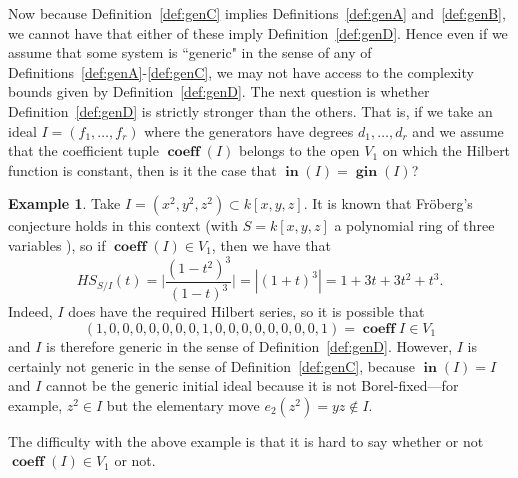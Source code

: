 \documentclass[11pt]{article}
\DeclareMathOperator{\Init}{\mathbf{in}}
\DeclareMathOperator{\gin}{\mathbf{gin}}
\DeclareMathOperator{\coeff}{\textbf{coeff}}
\theoremstyle{definition}
\newtheorem{example}{Example}
\begin{document}
Now because Definition~\ref{def:genC} implies Definitions~\ref{def:genA} and~\ref{def:genB}, we cannot have that either of these imply Definition~\ref{def:genD}. Hence even if we assume that some system is ``generic" in the sense of any of Definitions~\ref{def:genA}-\ref{def:genC}, we may not have access to the complexity bounds given by Definition~\ref{def:genD}. The next question is whether Definition~\ref{def:genD} is strictly stronger than the others. That is, if we take an ideal $I = (f_1, \dots, f_r)$ where the generators have degrees $d_1, \dots, d_r$ and we assume that the coefficient tuple $\coeff(I)$ belongs to the open $V_1$ on which the Hilbert function is constant, then is it the case that $\Init(I) = \gin(I)$? 

\begin{example}\label{maybecounterex}
	Take $I = (x^2, y^2, z^2) \subset k[x,y,z]$. It is known that Fröberg's conjecture holds in this context (with $S = k[x,y,z]$ a polynomial ring of three variables \cite{TRUNG201979}), so if $\coeff(I) \in V_1$, then we have that \[ HS_{S/I} (t) = \bigg| \frac{(1 - t^2)^3}{(1 - t)^3} \bigg| = |(1 + t)^3| = 1 + 3t + 3t^2 + t^3. \] Indeed, $I$ does have the required Hilbert series, so it is possible that \[ (1,0,0,0,0,0,0,0,1,0,0,0,0,0,0,0,0,1) = \coeff I \in V_1 \] and $I$ is therefore generic in the sense of Definition~\ref{def:genD}. However, $I$ is certainly not generic in the sense of Definition~\ref{def:genC}, because $\Init(I) = I$ and $I$ cannot be the generic initial ideal because it is not Borel-fixed---for example, $z^2 \in I$ but the elementary move $e_2(z^2) = yz \notin I$. 
\end{example}


The difficulty with the above example is that it is hard to say whether or not $\coeff(I) \in V_1$ or not. 



\nocite{M2}
\nocite{sage}

\newpage


\end{document}
